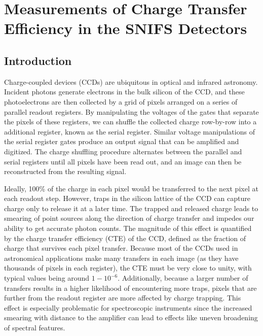 \chapter{Measurements of Charge Transfer Efficiency in the SNIFS Detectors}
\label{chap:cte}

\section{Introduction}
Charge-coupled devices (CCDs) are ubiquitous in optical and infrared astronomy. Incident photons generate electrons in the bulk silicon of the CCD, and these photoelectrons are then collected by a grid of pixels arranged on a series of parallel readout registers. By manipulating the voltages of the gates that separate the pixels of these registers, we can shuffle the collected charge row-by-row into a additional register, known as the serial register. Similar voltage manipulations of the serial register gates produce an output signal that can be amplified and digitized. The charge shuffling procedure alternates between the parallel and serial registers until all pixels have been read out, and an image can then be reconstructed from the resulting signal.

Ideally, 100\% of the charge in each pixel would be transferred to the next pixel at each readout step. However, traps in the silicon lattice of the CCD can capture charge only to release it at a later time. The trapped and released charge leads to smearing of point sources along the direction of charge transfer and impedes our ability to get accurate photon counts. The magnitude of this effect is quantified by the charge transfer efficiency (CTE) of the CCD, defined as the fraction of charge that survives each pixel transfer. Because most of the CCDs used in astronomical applications make many transfers in each image (as they have thousands of pixels in each register), the CTE must be very close to unity, with typical values being around $1-10^{-6}$. Additionally, because a larger number of transfers results in a higher likelihood of encountering more traps, pixels that are further from the readout register are more affected by charge trapping. This effect is especially problematic for spectroscopic instruments since the increased smearing with distance to the amplifier can lead to effects like uneven broadening of spectral features.

